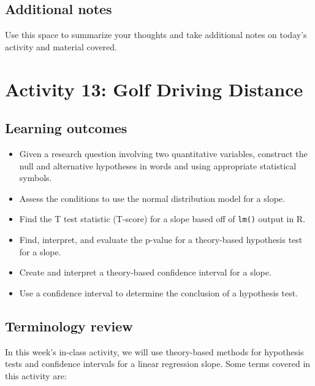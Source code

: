 \documentclass[
]{report}
\begin{document}
\hypertarget{additional-notes-6}{%
\subsection{Additional notes}\label{additional-notes-6}}

Use this space to summarize your thoughts and take additional notes on today's activity and material covered.

\newpage

\hypertarget{activity-13-golf-driving-distance}{%
\section{Activity 13: Golf Driving Distance}\label{activity-13-golf-driving-distance}}


\hypertarget{learning-outcomes-9}{%
\subsection{Learning outcomes}\label{learning-outcomes-9}}

\begin{itemize}
\item
  Given a research question involving two quantitative variables, construct the null and alternative hypotheses
  in words and using appropriate statistical symbols.
\item
  Assess the conditions to use the normal distribution model for a slope.
\item
  Find the T test statistic (T-score) for a slope based off of \texttt{lm()} output in R.
\item
  Find, interpret, and evaluate the p-value for a theory-based hypothesis test for a slope.
\item
  Create and interpret a theory-based confidence interval for a slope.
\item
  Use a confidence interval to determine the conclusion of a hypothesis test.
\end{itemize}

\hypertarget{terminology-review-7}{%
\subsection{Terminology review}\label{terminology-review-7}}

In this week's in-class activity, we will use theory-based methods for hypothesis tests and confidence intervals for a linear regression slope. Some terms covered in this activity are:
\end{document}

